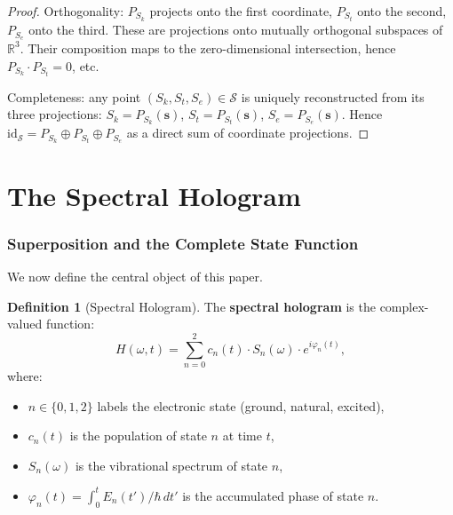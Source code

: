 \documentclass[11pt,a4paper]{article}
\theoremstyle{definition}
\newtheorem{definition}[theorem]{Definition}
\theoremstyle{remark}
\newcommand{\Sk}{S_k}
\newcommand{\St}{S_t}
\newcommand{\Se}{S_e}
\newcommand{\Sspace}{\mathcal{S}}
\begin{document}
\begin{proof}
Orthogonality: $P_{\Sk}$ projects onto the first coordinate, $P_{\St}$ onto the second, $P_{\Se}$ onto the third. These are projections onto mutually orthogonal subspaces of $\mathbb{R}^3$. Their composition maps to the zero-dimensional intersection, hence $P_{\Sk} \cdot P_{\St} = 0$, etc.

Completeness: any point $(\Sk, \St, \Se) \in \Sspace$ is uniquely reconstructed from its three projections: $\Sk = P_{\Sk}(\mathbf{s})$, $\St = P_{\St}(\mathbf{s})$, $\Se = P_{\Se}(\mathbf{s})$. Hence $\mathrm{id}_{\Sspace} = P_{\Sk} \oplus P_{\St} \oplus P_{\Se}$ as a direct sum of coordinate projections.
\end{proof}


\part{The Spectral Hologram}

\section{Superposition and the Complete State Function}
\label{sec:hologram}

We now define the central object of this paper.

\begin{definition}[Spectral Hologram]
\label{def:hologram}
The \textbf{spectral hologram} is the complex-valued function:
\begin{equation}
\label{eq:hologram}
H(\omega, t) = \sum_{n=0}^{2} c_n(t) \cdot S_n(\omega) \cdot e^{i\varphi_n(t)},
\end{equation}
where:
\begin{itemize}
  \item $n \in \{0, 1, 2\}$ labels the electronic state (ground, natural, excited),
  \item $c_n(t)$ is the population of state $n$ at time $t$,
  \item $S_n(\omega)$ is the vibrational spectrum of state $n$,
  \item $\varphi_n(t) = \int_0^t E_n(t')/\hbar \, dt'$ is the accumulated phase of state $n$.
\end{itemize}
\end{definition}
\end{document}
